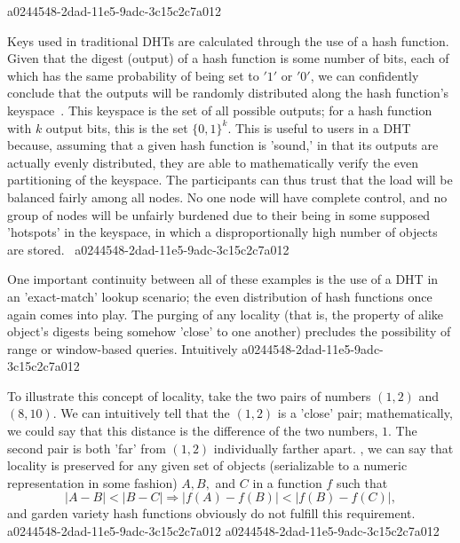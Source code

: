 \documentclass[12pt]{article}
\begin{document}
a0244548-2dad-11e5-9adc-3c15c2c7a012\par Keys used in traditional DHTs are calculated through the use of a hash function. Given that the digest (output) of a hash function is some number of bits, each of which has the same probability of being set to $'1'$ or $'0'$, we can confidently conclude that the outputs will be randomly distributed along the hash function's keyspace~. This keyspace is the set of all possible outputs; for a hash function with $k$ output bits, this is the set $\{0,1\}^k$. This is useful to users in a DHT because, assuming that a given hash function is 'sound,' in that its outputs are actually evenly distributed, they are able to mathematically verify the even partitioning of the keyspace. The participants can thus trust that the load will be balanced fairly among all nodes. No one node will have complete control, and no group of nodes will be unfairly burdened due to their being in some supposed 'hotspots' in the keyspace, in which a disproportionally high number of objects are stored.~
a0244548-2dad-11e5-9adc-3c15c2c7a012
\par One important continuity between all of these examples is the use of a DHT in an 'exact-match' lookup scenario; the even distribution of hash functions once again comes into play. The purging of any locality (that is, the property of alike object's digests being somehow 'close' to one another) precludes the possibility of range or window-based queries. Intuitively
a0244548-2dad-11e5-9adc-3c15c2c7a012
\par To illustrate this concept of locality, take the two pairs of numbers $(1,2)$ and $(8,10)$. We can intuitively tell that the $(1,2)$ is a 'close' pair; mathematically, we could say that this distance is the difference of the two numbers, $1$. The second pair is both 'far' from $(1,2)$ individually farther apart. , we can say that locality is preserved for any given set of objects (serializable to a numeric representation in some fashion) $A,B,$ and $C$ in a function $f$ such that
\begin{equation}
|A-B| < |B-C| \Rightarrow |f(A)-f(B)| < |f(B) - f(C)|,
\end{equation}
and garden variety hash functions obviously do not fulfill this requirement.
a0244548-2dad-11e5-9adc-3c15c2c7a012
\printbibliography
a0244548-2dad-11e5-9adc-3c15c2c7a012
\end{document}
